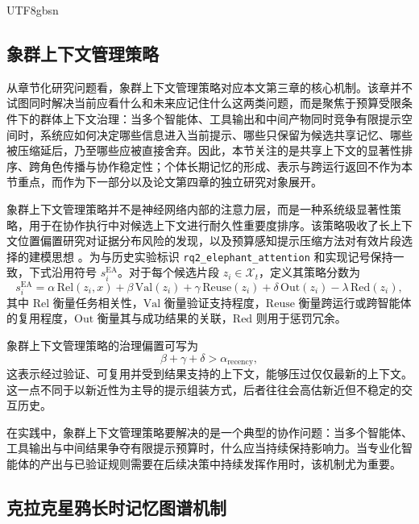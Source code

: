 \documentclass[a4paper,fleqn]{cas-sc}
\begin{document}
\begin{CJK*}{UTF8}{gbsn}
\subsection{象群上下文管理策略}

从章节化研究问题看，象群上下文管理策略对应本文第三章的核心机制。该章并不试图同时解决当前应看什么和未来应记住什么这两类问题，而是聚焦于预算受限条件下的群体上下文治理：当多个智能体、工具输出和中间产物同时竞争有限提示空间时，系统应如何决定哪些信息进入当前提示、哪些只保留为候选共享记忆、哪些被压缩延后，乃至哪些应被直接舍弃。因此，本节关注的是共享上下文的显著性排序、跨角色传播与协作稳定性；个体长期记忆的形成、表示与跨运行返回不作为本节重点，而作为下一部分以及论文第四章的独立研究对象展开。

象群上下文管理策略并不是神经网络内部的注意力层，而是一种系统级显著性策略，用于在协作执行中对候选上下文进行耐久性重要度排序。该策略吸收了长上下文位置偏置研究对证据分布风险的发现，以及预算感知提示压缩方法对有效片段选择的建模思想 \citep{liu2024lostmiddle,li2023selectivecontext,jiang2023llmlingua}。为与历史实验标识 \texttt{rq2\_elephant\_attention} 和实现记号保持一致，下式沿用符号 $s_i^{\text{EA}}$。对于每个候选片段 $z_i \in \mathcal{X}_t$，定义其策略分数为
\begin{equation}
s_i^{\text{EA}} = \alpha \, \mathrm{Rel}(z_i, x) + \beta \, \mathrm{Val}(z_i) + \gamma \, \mathrm{Reuse}(z_i) + \delta \, \mathrm{Out}(z_i) - \lambda \, \mathrm{Red}(z_i),
\end{equation}
其中 $\mathrm{Rel}$ 衡量任务相关性，$\mathrm{Val}$ 衡量验证支持程度，$\mathrm{Reuse}$ 衡量跨运行或跨智能体的复用程度，$\mathrm{Out}$ 衡量其与成功结果的关联，$\mathrm{Red}$ 则用于惩罚冗余。

象群上下文管理策略的治理偏置可写为
\begin{equation}
\beta + \gamma + \delta > \alpha_{\text{recency}},
\end{equation}
这表示经过验证、可复用并受到结果支持的上下文，能够压过仅仅最新的上下文。这一点不同于以新近性为主导的提示组装方式，后者往往会高估新近但不稳定的交互历史。

在实践中，象群上下文管理策略要解决的是一个典型的协作问题：当多个智能体、工具输出与中间结果争夺有限提示预算时，什么应当持续保持影响力。当专业化智能体的产出与已验证规则需要在后续决策中持续发挥作用时，该机制尤为重要。

\subsection{克拉克星鸦长时记忆图谱机制}


\end{CJK*}
\end{document}
